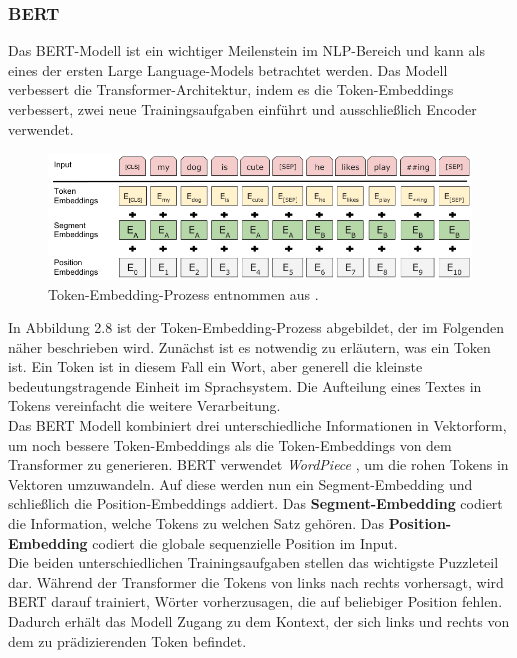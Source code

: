 \documentclass[12pt,letterpaper,ngerman]{article}
\begin{document}
\subsubsection{BERT}
Das BERT-Modell \cite{conf/naacl/DevlinCLT19} 
ist ein wichtiger Meilenstein im NLP-Bereich und kann 
als eines der ersten Large Language-Models betrachtet werden.
Das Modell verbessert die Transformer-Architektur, 
indem es die Token-Embeddings verbessert, zwei neue Trainingsaufgaben einführt
und ausschließlich Encoder verwendet.
\begin{figure}
  \begin{center}
    \includegraphics[scale=0.5]{abb/BERT-Tokens.png}
  \end{center}
  \caption{
    Token-Embedding-Prozess entnommen aus 
    \cite{conf/naacl/DevlinCLT19}.
  }
\end{figure}
In Abbildung 2.8 ist der Token-Embedding-Prozess abgebildet,
der im Folgenden näher beschrieben wird. Zunächst ist es 
notwendig zu erläutern, was ein Token ist. Ein Token ist in 
diesem Fall ein Wort, 
aber generell die kleinste bedeutungstragende Einheit im
Sprachsystem. Die Aufteilung eines Textes in Tokens vereinfacht
die weitere Verarbeitung.\\
Das BERT Modell kombiniert drei unterschiedliche Informationen
in Vektorform, um noch bessere Token-Embeddings als die 
Token-Embeddings von dem Transformer zu generieren. BERT
verwendet \textit{WordPiece} 
\cite{wu2016googlesneuralmachinetranslation},
um die rohen Tokens in Vektoren umzuwandeln.
Auf diese werden nun ein Segment-Embedding und schließlich die
Position-Embeddings addiert.
Das {\bf Segment-Embedding} codiert die Information,
welche Tokens zu welchen Satz gehören.
Das {\bf Position-Embedding} codiert die globale sequenzielle
Position im Input.\\
Die beiden unterschiedlichen Trainingsaufgaben stellen das wichtigste
Puzzleteil dar. Während der Transformer die Tokens von links nach rechts
vorhersagt, wird BERT darauf trainiert, Wörter vorherzusagen, die auf
beliebiger Position fehlen. Dadurch erhält das Modell Zugang zu dem
Kontext, der sich links und rechts von dem zu prädizierenden Token befindet.
\end{document}
